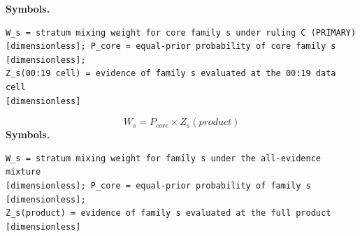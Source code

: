 \documentclass[11pt,a4paper]{article}
\begin{document}
\noindent\textbf{Symbols.}
\begin{verbatim}
W_s = stratum mixing weight for core family s under ruling C (PRIMARY)
[dimensionless]; P_core = equal-prior probability of core family s [dimensionless];
Z_s(00:19 cell) = evidence of family s evaluated at the 00:19 data cell
[dimensionless]
\end{verbatim}
\medskip
\begin{equation}
W_s = P_{core} \times Z_s(product)
\end{equation}
\noindent\textbf{Symbols.}
\begin{verbatim}
W_s = stratum mixing weight for family s under the all-evidence mixture
[dimensionless]; P_core = equal-prior probability of family s [dimensionless];
Z_s(product) = evidence of family s evaluated at the full product [dimensionless]
\end{verbatim}
\medskip
\end{document}
